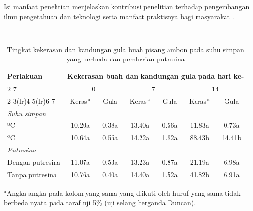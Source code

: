 Isi manfaat penelitian menjelaskan kontribusi penelitian terhadap pengembangan
ilmu pengetahuan dan teknologi serta manfaat praktisnya bagi masyarakat
\citep{Widowati2020}.


\begin{table}[H]
  \caption{Tingkat kekerasan dan kandungan gula buah pisang ambon
           pada suhu simpan yang berbeda dan pemberian putresina}
  \label{tab:pisang_ambon}
  \centering
  \  %
  \begin{tabular}{lcccccc}
    \toprule
    \multirow{2}{*}{Perlakuan}
      & \multicolumn{6}{c}{Kekerasan buah dan kandungan gula pada hari ke-} \\
    \cmidrule(lr){2-7}
      & \multicolumn{2}{c}{0} & \multicolumn{2}{c}{7} & \multicolumn{2}{c}{14} \\
    \cmidrule(lr){2-3}\cmidrule(lr){4-5}\cmidrule(lr){6-7}
      & Keras$^{\,\mathrm{a}}$ & Gula & Keras$^{\,\mathrm{a}}$ & Gula
      & Keras$^{\,\mathrm{a}}$ & Gula \\
    \midrule
    \multicolumn{7}{l}{\textit{Suhu simpan}} \\
    \quad 15 ºC  & 10.20a & 0.38a & 13.40a & 0.56a & 11.83a & 0.73a \\
    \quad 28 ºC  & 10.64a & 0.55a & 14.22a & 1.82a & 88.43b & 14.41b \\
    \multicolumn{7}{l}{\textit{Putresina}} \\
    \quad Dengan putresina  & 11.07a & 0.53a & 13.23a & 0.87a & 21.19a & 6.98a \\
    \quad Tanpa putresina   & 10.76a & 0.40a & 14.40a & 1.52a & 41.82b & 6.91a \\
    \bottomrule
  \end{tabular}
  \begin{minipage}{\linewidth}
    \vspace{2pt}
    \footnotesize
    $^{\mathrm{a}}$Angka-angka pada kolom yang sama yang diikuti oleh huruf yang
    sama tidak berbeda nyata pada taraf uji 5\% (uji selang berganda Duncan).
  \end{minipage}
\end{table}


